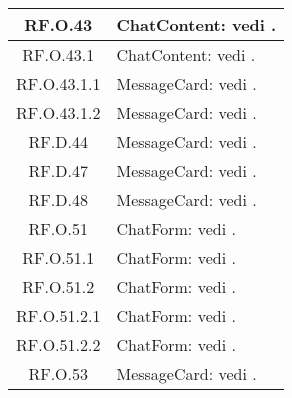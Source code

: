 \documentclass[10pt, a4paper]{article}
\begin{document}
\begin{xltabular}{\textwidth}{c|X}
\hline
RF.O.43 & ChatContent: vedi .\\%
\hline
RF.O.43.1 & ChatContent: vedi .\\ %
\hline
RF.O.43.1.1 &  MessageCard: vedi .\\%
\hline
RF.O.43.1.2 & MessageCard: vedi .\\ %
\hline
RF.D.44 & MessageCard: vedi .\\%
\hline
RF.D.47 &  MessageCard: vedi .\\ %
\hline
RF.D.48 & MessageCard: vedi .\\%
\hline
RF.O.51 & ChatForm: vedi .\\ %
\hline
RF.O.51.1 & ChatForm: vedi .\\%
\hline
RF.O.51.2 & ChatForm: vedi . \\%
\hline
RF.O.51.2.1 & ChatForm: vedi . \\ %
\hline
RF.O.51.2.2& ChatForm: vedi . \\%
\hline
RF.O.53 & MessageCard: vedi .\\ %
\end{xltabular}

\end{document}
